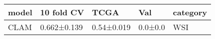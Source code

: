 \begin{tabular}{lllll}
\toprule
model &  10 fold CV &       TCGA &     Val & category \\
\midrule
 CLAM & 0.662±0.139 & 0.54±0.019 & 0.0±0.0 &      WSI \\
\bottomrule
\end{tabular}
